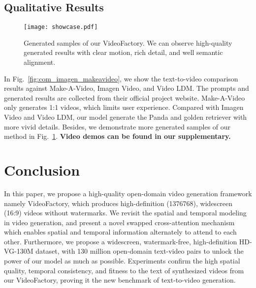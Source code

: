 \documentclass{article}
\begin{document}
\subsection{Qualitative Results}
\begin{figure}[t]
    \centering
    \texttt{[image: showcase.pdf]}
    \caption{Generated samples of our VideoFactory. We can observe high-quality generated results with clear motion, rich detail, and well semantic alignment.}
    \label{fig:showcase_our}
    \vspace{-5mm}
\end{figure}

In Fig.~\ref{fig:com_imagen_makeavideo}, we show the text-to-video comparison results against Make-A-Video, Imagen Video, and Video LDM.
The prompts and generated results are collected from their official project website.
Make-A-Video only generates 1:1 videos, which limits user experience.
Compared with Imagen Video and Video LDM, our model generate the Panda and golden retriever with more vivid details.
Besides, we demonstrate more generated samples of our method in Fig.~\ref{fig:showcase_our}.
\textbf{Video demos can be found in our supplementary.}


\section{Conclusion}
In this paper, we propose a high-quality open-domain video generation framework namely VideoFactory, which produces high-definition (1376768), widescreen (16:9) videos without watermarks.
We revisit the spatial and temporal modeling in video generation, and present a novel swapped cross-attention mechanism which enables spatial and temporal information alternately to attend to each other.
Furthermore, we propose a widescreen, watermark-free, high-definition HD-VG-130M dataset, with 130 million open-domain text-video pairs to unlock the power of our model as much as possible.
Experiments confirm the high spatial quality, temporal consistency, and fitness to the text of synthesized videos from our VideoFactory, proving it the new benchmark of text-to-video generation.



\end{document}
